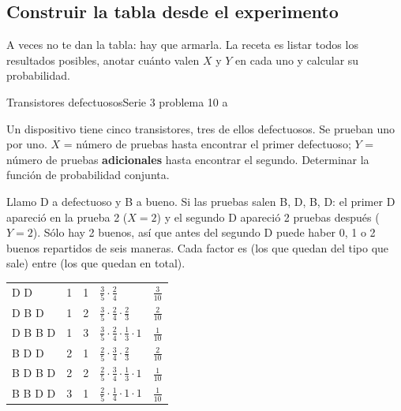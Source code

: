 \subsection{Construir la tabla desde el experimento}

A veces no te dan la tabla: hay que armarla. La receta es listar todos los resultados posibles, anotar cu\'anto valen
$X$ y $Y$ en cada uno y calcular su probabilidad.

\begin{resuelto}{Transistores defectuosos}{Serie 3 \textbullet{} problema 10 a}
\begin{enunciado}
Un dispositivo tiene cinco transistores, tres de ellos defectuosos. Se prueban uno por uno.
$X$ = n\'umero de pruebas hasta encontrar el primer defectuoso; $Y$ = n\'umero de pruebas \textbf{adicionales} hasta encontrar el segundo.
Determinar la funci\'on de probabilidad conjunta.
\end{enunciado}
\begin{pasos}
Llamo D a defectuoso y B a bueno. Si las pruebas salen B, D, B, D: el primer D apareci\'o en la prueba 2 ($X=2$)
y el segundo D apareci\'o 2 pruebas despu\'es ($Y=2$).
S\'olo hay 2 buenos, as\'i que antes del segundo D puede haber 0, 1 o 2 buenos repartidos de seis maneras.
Cada factor es (los que quedan del tipo que sale) entre (los que quedan en total).
\begin{center}\small
\begin{tabular}{|>{\centering\arraybackslash}p{2.1cm}|C|C|p{5.6cm}|C|}\hline
{} &  &  &  & \\\hline
D D & 1 & 1 & $\tfrac35\cdot\tfrac24$ & $\tfrac{3}{10}$\\\hline
D B D & 1 & 2 & $\tfrac35\cdot\tfrac24\cdot\tfrac23$ & $\tfrac{2}{10}$\\\hline
D B B D & 1 & 3 & $\tfrac35\cdot\tfrac24\cdot\tfrac13\cdot1$ & $\tfrac{1}{10}$\\\hline
B D D & 2 & 1 & $\tfrac25\cdot\tfrac34\cdot\tfrac23$ & $\tfrac{2}{10}$\\\hline
B D B D & 2 & 2 & $\tfrac25\cdot\tfrac34\cdot\tfrac13\cdot1$ & $\tfrac{1}{10}$\\\hline
B B D D & 3 & 1 & $\tfrac25\cdot\tfrac14\cdot1\cdot1$ & $\tfrac{1}{10}$\\\hline
\end{tabular}

\end{center}
\end{pasos}
\end{resuelto}
